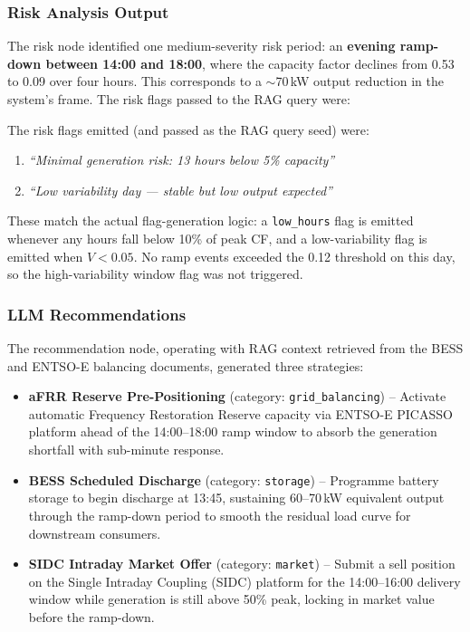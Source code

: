 \documentclass[12pt, a4paper]{article}
\begin{document}
\subsubsection{Risk Analysis Output}

The risk node identified one medium-severity risk period: an \textbf{evening ramp-down between 14:00 and 18:00}, where the capacity factor declines from 0.53 to 0.09 over four hours. This corresponds to a $\sim$70\,kW output reduction in the system's frame. The risk flags passed to the RAG query were:

The risk flags emitted (and passed as the RAG query seed) were:
\begin{enumerate}[noitemsep]
    \item \textit{``Minimal generation risk: 13 hours below 5\% capacity''}
    \item \textit{``Low variability day --- stable but low output expected''}
\end{enumerate}

These match the actual flag-generation logic: a \texttt{low\_hours} flag is emitted whenever any hours fall below 10\% of peak CF, and a low-variability flag is emitted when $V < 0.05$. No ramp events exceeded the 0.12 threshold on this day, so the high-variability window flag was not triggered.

\clearpage
\subsubsection{LLM Recommendations}

The recommendation node, operating with RAG context retrieved from the BESS and ENTSO-E balancing documents, generated three strategies:

\begin{itemize}[noitemsep]
    \item \textbf{aFRR Reserve Pre-Positioning} (category: \texttt{grid\_balancing}) -- Activate automatic Frequency Restoration Reserve capacity via ENTSO-E PICASSO platform ahead of the 14:00--18:00 ramp window to absorb the generation shortfall with sub-minute response.
    \item \textbf{BESS Scheduled Discharge} (category: \texttt{storage}) -- Programme battery storage to begin discharge at 13:45, sustaining 60--70\,kW equivalent output through the ramp-down period to smooth the residual load curve for downstream consumers.
    \item \textbf{SIDC Intraday Market Offer} (category: \texttt{market}) -- Submit a sell position on the Single Intraday Coupling (SIDC) platform for the 14:00--16:00 delivery window while generation is still above 50\% peak, locking in market value before the ramp-down.
\end{itemize}
\end{document}
